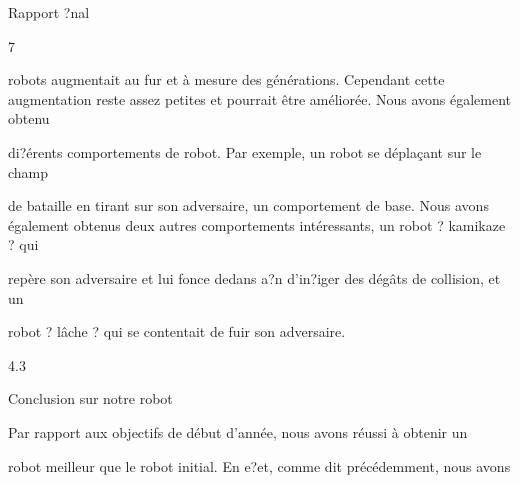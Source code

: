 \documentclass[a4paper,portrait,12pt]{article}
\begin{document}
\begin{flushleft}
\newpage
Rapport ?nal
\end{flushleft}





7





\begin{flushleft}
robots augmentait au fur et \`{a} mesure des g\'{e}n\'{e}rations. Cependant cette augmentation reste assez petites et pourrait \^{e}tre am\'{e}lior\'{e}e. Nous avons \'{e}galement obtenu
\end{flushleft}


\begin{flushleft}
di?\'{e}rents comportements de robot. Par exemple, un robot se d\'{e}pla\c{c}ant sur le champ
\end{flushleft}


\begin{flushleft}
de bataille en tirant sur son adversaire, un comportement de base. Nous avons \'{e}galement obtenus deux autres comportements int\'{e}ressants, un robot ? kamikaze ? qui
\end{flushleft}


\begin{flushleft}
rep\`{e}re son adversaire et lui fonce dedans a?n d'in?iger des d\'{e}g\^{a}ts de collision, et un
\end{flushleft}


\begin{flushleft}
robot ? l\^{a}che ? qui se contentait de fuir son adversaire.
\end{flushleft}


4.3





\begin{flushleft}
Conclusion sur notre robot
\end{flushleft}





\begin{flushleft}
Par rapport aux objectifs de d\'{e}but d'ann\'{e}e, nous avons r\'{e}ussi \`{a} obtenir un
\end{flushleft}


\begin{flushleft}
robot meilleur que le robot initial. En e?et, comme dit pr\'{e}c\'{e}demment, nous avons
\end{flushleft}
\end{document}
